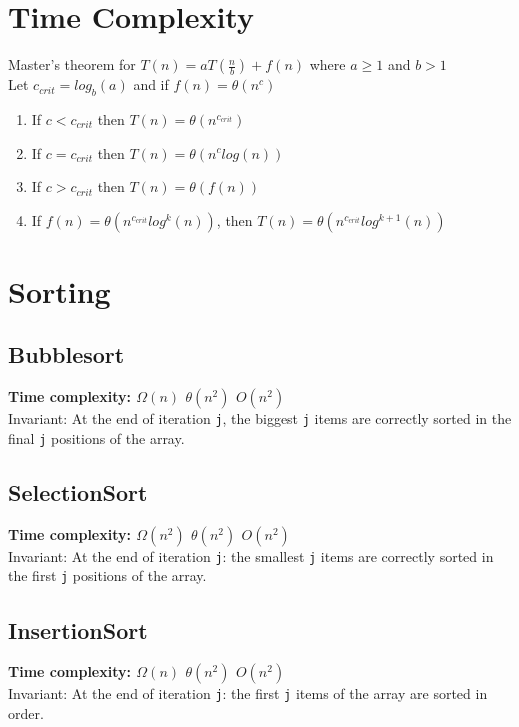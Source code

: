 \documentclass[10pt,landscape,a4paper]{article}
\begin{document}
\small
\begin{multicols*}{4}
\section{Time Complexity}
{Master's theorem for $T(n) = aT(\frac{n}{b}) + f(n)$ where $a \geq 1$ and $b > 1$} \\
Let $c_{crit} = log_b(a)$ and if $f(n) = \theta(n^c)$
\begin{enumerate}
    \item {If $c < c_{crit}$ then $T(n) = \theta(n^{c_{crit}})$} 
    \item {If $c = c_{crit}$ then $T(n) = \theta(n^clog(n))$} 
    \item {If $c > c_{crit}$ then $T(n) = \theta(f(n))$} 
    \item {If $f(n) = \theta(n^{c_{crit}}log^k(n))$, then $T(n) = \theta(n^{c_{crit}}log^{k+1}(n))$} 

\end{enumerate}

\section{Sorting}
\subsection{Bubblesort}
\textbf{Time complexity: $\Omega({n})$ $\theta(n^2)$ $O(n^2)$} \\
Invariant: At the end of iteration \texttt{j}, the biggest \texttt{j} items are correctly sorted in the final \texttt{j} positions of the array.

\subsection{SelectionSort}
\textbf{Time complexity: $\Omega({n^2})$ $\theta(n^2)$ $O(n^2)$} \\
Invariant: At the end of iteration \texttt{j}: the smallest \texttt{j} items are correctly sorted in the first \texttt{j} positions of the array.

\subsection{InsertionSort}
\textbf{Time complexity: $\Omega({n})$ $\theta(n^2)$ $O(n^2)$} \\
Invariant: At the end of iteration \texttt{j}: the first \texttt{j} items of the array are sorted in order.


\end{multicols*}
\end{document}
